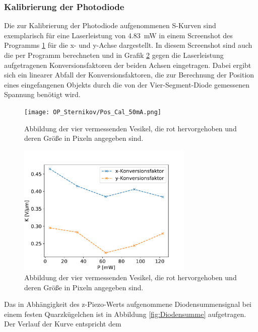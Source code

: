        \subsubsection{Kalibrierung der Photodiode}
            Die zur Kalibrierung der Photodiode aufgenommenen S-Kurven sind exemplarisch für eine Laserleistung von \SI{4.83}{\milli\watt} in einem Screenshot des Programms \ref{fig:pos_cal} für die x- und 
            y-Achse dargestellt. In diesem Screenshot sind auch die per Programm berechneten und in Grafik \ref{fig:Konversion} gegen die Laserleistung aufgetragenen Konversionsfaktoren der beiden Achsen 
            eingetragen. Dabei ergibt sich ein linearer Abfall der Konversionsfaktoren, die zur Berechnung der Position eines eingefangenen Objekts durch die von der Vier-Segment-Diode gemessenen Spannung 
            benötigt wird.
            \begin{figure}[h]
            \centering
            \texttt{[image: OP\_Sternikov/Pos\_Cal\_50mA.png]}
            \caption{Abbildung der vier vermessenden Vesikel, die rot hervorgehoben und deren Größe in Pixeln angegeben sind.}
            \label{fig:pos_cal}
            \end{figure}
            \FloatBarrier
            \begin{figure}[h]
            \centering
            \includegraphics[width = 0.75\textwidth]{Konversion.pdf}
            \caption{Abbildung der vier vermessenden Vesikel, die rot hervorgehoben und deren Größe in Pixeln angegeben sind.}
            \label{fig:Konversion}
            \end{figure}
            \FloatBarrier
            Das in Abhängigkeit des z-Piezo-Werts aufgenommene Diodensummensignal bei einem festen Quarzkügelchen ist in Abbildung \ref{fig:Diodensumme} aufgetragen. Der Verlauf der Kurve entspricht dem
